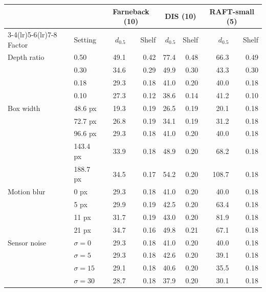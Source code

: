\begin{tabular}{@{}llrrrrrr@{}}
\toprule
 & & \multicolumn{2}{c}{Farneback (10)} & \multicolumn{2}{c}{DIS (10)} & \multicolumn{2}{c}{RAFT-small (5)} \\
\cmidrule(lr){3-4}\cmidrule(lr){5-6}\cmidrule(lr){7-8}
Factor & Setting & $d_{0.5}$ & Shelf & $d_{0.5}$ & Shelf & $d_{0.5}$ & Shelf \\
\midrule
Depth ratio & 0.50 & 49.1 & 0.42 & 77.4 & 0.48 & 66.3 & 0.49 \\
 & 0.30 & 34.6 & 0.29 & 49.9 & 0.30 & 43.3 & 0.30 \\
 & 0.18 & 29.3 & 0.18 & 41.0 & 0.20 & 40.0 & 0.18 \\
 & 0.10 & 27.3 & 0.12 & 38.6 & 0.14 & 41.2 & 0.10 \\
\midrule
Box width & 48.6 px & 19.3 & 0.19 & 26.5 & 0.19 & 20.1 & 0.18 \\
 & 72.7 px & 26.8 & 0.19 & 34.1 & 0.19 & 31.2 & 0.18 \\
 & 96.6 px & 29.3 & 0.18 & 41.0 & 0.20 & 40.0 & 0.18 \\
 & 143.4 px & 33.9 & 0.18 & 48.9 & 0.20 & 68.2 & 0.18 \\
 & 188.7 px & 34.5 & 0.17 & 54.2 & 0.20 & 108.7 & 0.18 \\
\midrule
Motion blur & 0 px & 29.3 & 0.18 & 41.0 & 0.20 & 40.0 & 0.18 \\
 & 5 px & 29.9 & 0.19 & 42.5 & 0.20 & 63.4 & 0.18 \\
 & 11 px & 31.7 & 0.19 & 43.0 & 0.20 & 81.9 & 0.18 \\
 & 21 px & 34.7 & 0.16 & 49.8 & 0.21 & 67.1 & 0.18 \\
\midrule
Sensor noise & $\sigma=0$ & 29.3 & 0.18 & 41.0 & 0.20 & 40.0 & 0.18 \\
 & $\sigma=5$ & 29.3 & 0.18 & 42.6 & 0.20 & 39.1 & 0.18 \\
 & $\sigma=15$ & 29.1 & 0.18 & 40.6 & 0.20 & 35.5 & 0.18 \\
 & $\sigma=30$ & 28.7 & 0.18 & 37.9 & 0.20 & 30.1 & 0.18 \\
\bottomrule
\end{tabular}
